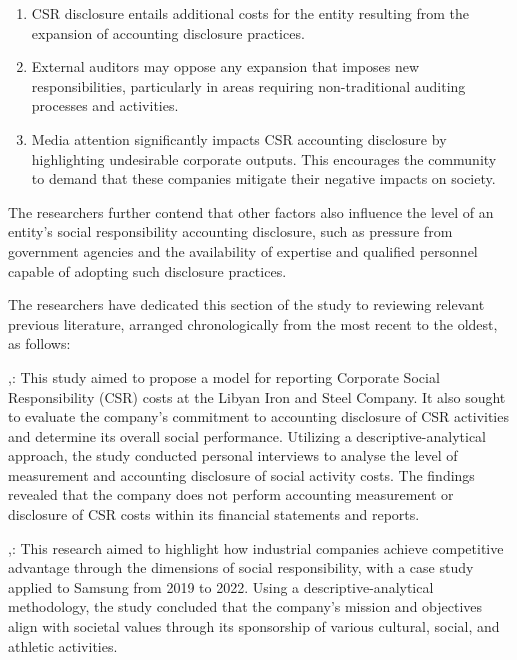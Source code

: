 \documentclass[10pt]{NSP1}
\begin{document}
\begin{enumerate}
  \item CSR disclosure entails additional costs for the entity resulting from the expansion of accounting disclosure practices.
  \item External auditors may oppose any expansion that imposes new responsibilities, particularly in areas requiring non-traditional auditing processes and activities.
  \item Media attention significantly impacts CSR accounting disclosure by highlighting undesirable corporate outputs. This encourages the community to demand that these companies mitigate their negative impacts on society.
\end{enumerate}

The researchers further contend that other factors also influence the level of an entity's social responsibility accounting disclosure, such as pressure from government agencies and the availability of expertise and qualified personnel capable of adopting such disclosure practices.

\par\vspace{6.0pt}\vspace{12.0pt}

The researchers have dedicated this section of the study to reviewing relevant previous literature, arranged chronologically from the most recent to the oldest, as follows:

\cite{ref29},: This study aimed to propose a model for reporting Corporate Social Responsibility (CSR) costs at the Libyan Iron and Steel Company. It also sought to evaluate the company's commitment to accounting disclosure of CSR activities and determine its overall social performance. Utilizing a descriptive-analytical approach, the study conducted personal interviews to analyse the level of measurement and accounting disclosure of social activity costs. The findings revealed that the company does not perform accounting measurement or disclosure of CSR costs within its financial statements and reports.

\cite{ref31},: This research aimed to highlight how industrial companies achieve competitive advantage through the dimensions of social responsibility, with a case study applied to Samsung from 2019 to 2022. Using a descriptive-analytical methodology, the study concluded that the company's mission and objectives align with societal values through its sponsorship of various cultural, social, and athletic activities.
\end{document}
